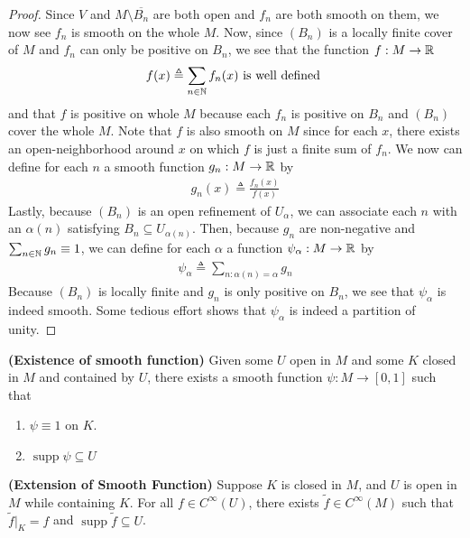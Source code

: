 \documentclass{report}
\begin{document}
\begin{proof}
Since $V$ and  $M \setminus \overline{B_n}$ are both open and $f_n$ are both smooth on them, we now see  $f_n$ is smooth on the whole  $M$. Now, since $(B_n)$ is a locally finite cover of $M$ and $f_n$ can only be positive on  $B_n$, we see that the function $f:M\rightarrow \mathbb{R}$ 
\begin{align*}
f(x)\triangleq \sum_{n\in\mathbb{N}}f_n(x)\text{ is well defined }
\end{align*}
and that $f$ is positive on whole $M$  because each $f_n$ is positive on $B_n$ and $(B_n)$ cover the whole $M$. Note that $f$ is also smooth on $M$ since for each $x$, there exists an open-neighborhood around $x$ on which $f$ is just a finite sum of $f_n$. We now can define for each $n$ a smooth function  $g_n:M\rightarrow \mathbb{R}$ by 
\begin{align*}
g_n(x)\triangleq \frac{f_n(x)}{f(x)}
\end{align*}
Lastly, because $(B_n)$ is an open refinement of $U_\alpha $, we can associate each $n$ with an $\alpha (n)$ satisfying $B_n \subseteq U_{\alpha (n)}$. Then, because $g_n$ are non-negative and  $\sum_{n\in\mathbb{N}}g_n\equiv 1$, we can define for each $\alpha $ a function $\psi_\alpha :M\rightarrow \mathbb{R}$ by 
\begin{align*}
\psi_\alpha \triangleq \sum_{n:\alpha (n)=\alpha } g_n
\end{align*}
Because $(B_n)$ is locally finite and $g_n$ is only positive on $B_n$, we see that  $\psi_\alpha $ is indeed smooth. Some tedious effort shows that $\psi_\alpha $ is indeed a partition of unity.  

\end{proof}
\begin{corollary}
\label{EoSB}
\textbf{(Existence of smooth function)} Given some  $U$ open in $M$ and some $K$ closed in $M$ and contained by  $U$, there exists a smooth function  $\psi : M\rightarrow [0,1]$ such that 
\begin{enumerate}[label=(\alph*)]
  \item $\psi \equiv 1$ on $K$. 
  \item $\operatorname{supp}\psi \subseteq U$
\end{enumerate}
\end{corollary}
\begin{corollary}
\label{EoSF}
\textbf{(Extension of Smooth Function)} Suppose $K$ is closed in $M$, and $U$ is open in  $M$ while containing  $K$. For all $f\in C^{\infty}(U)$, there exists $\tilde{f}\in C^{\infty}(M)$ such that $\tilde{f}|_K=f$ and $\operatorname{supp}\tilde{f}\subseteq U$. 
\end{corollary}
\end{document}
